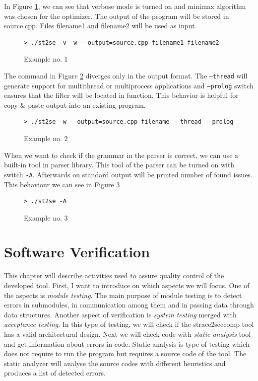 In Figure \ref{exec/run1}, we can see that verbose mode is turned on and minimax
algorithm was chosen for the optimizer. The output of the program will be stored
in source.cpp. Files filename1 and filename2 will be used as input.

\begin{figure}[h]
	\lstset{style=npl}
\begin{lstlisting}
> ./st2se -v -w --output=source.cpp filename1 filename2
\end{lstlisting}
	\caption{Example no. 1}
	\label{exec/run1}
\end{figure}

The command in Figure \ref{exec/run2} diverges only in the output format. The
\texttt{--thread} will generate support for multithread or multiprocess applications and
\texttt{--prolog} switch ensures that the filter will be located in function. This
behavior is helpful for copy \& paste output into an existing program.

\begin{figure}[h]
	\lstset{style=npl}
\begin{lstlisting}
> ./st2se -w --output=source.cpp filename --thread --prolog
\end{lstlisting}
	\caption{Example no. 2}
	\label{exec/run2}
\end{figure}

When we want to check if the grammar in the parser is correct, we can use a
built-in tool in parser library. This tool of the parser can be turned on with
switch \texttt{-A}. Afterwards on standard output will be printed number of
found issues. This behaviour we can see in Figure \ref{exec/run3}

\begin{figure}[h]
	\lstset{style=npl}
\begin{lstlisting}
> ./st2se -A
\end{lstlisting}
	\caption{Example no. 3}
	\label{exec/run3}
\end{figure}

\chapter{Software Verification}
This chapter will describe activities used to assure quality control of the
developed tool. First, I want to introduce on which aspects we will focus. One
of the aspects is \textit{module testing}. The main purpose of module testing is
to detect errors in submodules, in communication among them and in passing data
through data structures. Another aspect of verification is \textit{system
testing} merged with \textit{acceptance testing}. In this type of testing, we
will check if the strace2seccomp tool has a valid architectural design. Next we
will check code with \textit{static analysis} tool and get information about
errors in code. Static analysis is type of testing which does not require to run
the program but requires a source code of the tool. The static analyzer will
analyse the source codes with different heuristics and produces a list of
detected errors.


